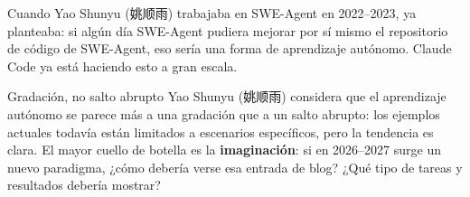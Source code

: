 Cuando Yao Shunyu (姚顺雨) trabajaba en SWE-Agent en 2022--2023, ya planteaba: si algún día SWE-Agent pudiera mejorar por sí mismo el repositorio de código de SWE-Agent, eso sería una forma de aprendizaje autónomo. Claude Code ya está haciendo esto a gran escala.

\begin{warningbox}{Gradación, no salto abrupto}
Yao Shunyu (姚顺雨) considera que el aprendizaje autónomo se parece más a una gradación que a un salto abrupto: los ejemplos actuales todavía están limitados a escenarios específicos, pero la tendencia es clara. El mayor cuello de botella es la \textbf{imaginación}: si en 2026--2027 surge un nuevo paradigma, ¿cómo debería verse esa entrada de blog? ¿Qué tipo de tareas y resultados debería mostrar?
\end{warningbox}

